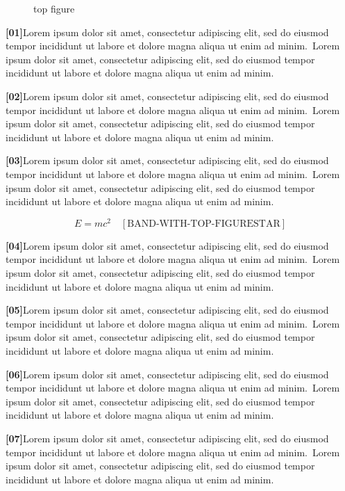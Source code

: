 \documentclass[twocolumn]{article}
\newcommand\Body{Lorem ipsum dolor sit amet, consectetur adipiscing elit, sed do
eiusmod tempor incididunt ut labore et dolore magna aliqua ut enim ad minim.}
\newcommand\Par[1]{\par\noindent\textbf{[#1]}\space\Body\ \Body\par\medskip}
\begin{document}
\begin{figure}[!t]\centering\fbox{\rule{0pt}{90pt}\rule{\columnwidth}{0pt}}\caption{top figure}\end{figure}
\Par{01}\Par{02}\Par{03}
\begin{wideband}\[ E=mc^2 \quad[\text{BAND-WITH-TOP-FIGURESTAR}] \]\end{wideband}
\Par{04}\Par{05}\Par{06}\Par{07}
\end{document}
